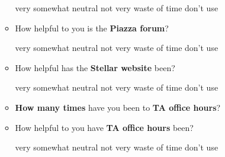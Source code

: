 \documentclass[handout]{mcs}
\begin{document}
\begin{itemize}
\begin{itemize}
\begin{center}
very\hspace{0.3in} somewhat \hspace{0.3in} neutral\hspace{0.3in} not
very \hspace{0.3in} waste of time  \hspace{0.7in}don't use
\end{center}

\iffalse
\begin{center}
very well\hspace{0.3in} mostly\hspace{0.3in} adequately\hspace{0.3in}
partially\hspace{0.3in} poorly  \hspace{0.7in} don't use
\end{center}
\fi

\item How helpful to you is the \textbf{Piazza forum}?

\begin{center}
very\hspace{0.3in} somewhat \hspace{0.3in} neutral\hspace{0.3in} not
very \hspace{0.3in} waste of time  \hspace{0.7in}don't use
\end{center}


\item How helpful has the \textbf{Stellar website} been?

\begin{center}
very\hspace{0.3in} somewhat \hspace{0.3in} neutral\hspace{0.3in} not
very \hspace{0.3in} waste of time  \hspace{0.7in}don't use
\end{center}


\item \textbf{How many times} have you been to \textbf{TA office hours}?\brule{0.7in}


\item How helpful to you have \textbf{TA office hours} been?
 
\begin{center}
very\hspace{0.3in} somewhat \hspace{0.3in} neutral\hspace{0.3in} not
very \hspace{0.3in} waste of time  \hspace{0.7in}don't use
\end{center}


\end{itemize}
\end{itemize}
\end{document}
